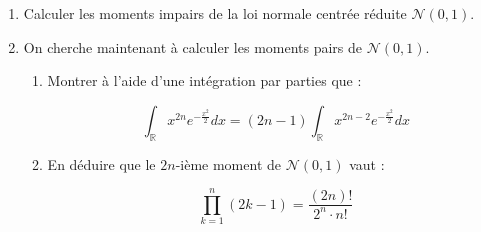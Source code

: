 \medskip

\begin{mdframed}
\begin{exercice}
\begin{enumerate}
    \item Calculer les moments impairs de la loi normale centrée réduite $\mathcal{N}(0, 1)$.
    \item On cherche maintenant à calculer les moments pairs de $\mathcal{N}(0, 1)$.
    \begin{enumerate}
        \item Montrer à l'aide d'une intégration par parties que :
        
        $$
        \int_{\mathbb{R}} x^{2n}e^{-\frac{x^2}{2}} dx = (2n - 1) \int_{\mathbb{R}} x^{2n-2}e^{-\frac{x^2}{2}} dx
        $$
        \item En déduire que le $2n$-ième moment de $\mathcal{N}(0, 1)$ vaut :
        
        $$
        \prod_{k=1}^n (2k - 1) = \frac{(2n)!}{2^n \cdot n!}
        $$
    \end{enumerate}
\end{enumerate}
\end{exercice}
\end{mdframed}